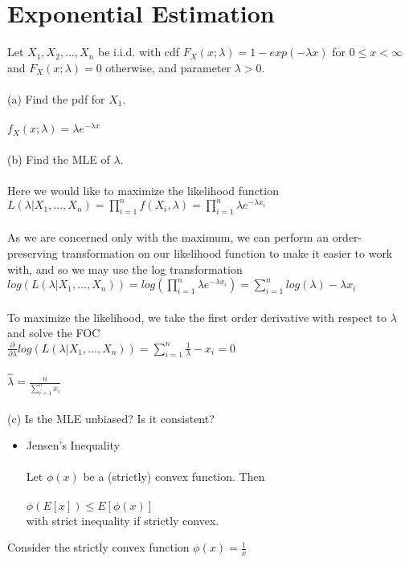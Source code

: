 \documentclass{article}
\begin{document}
\section{Exponential Estimation}
Let $X_1,X_2,...,X_n$ be i.i.d. with cdf $F_X(x;\lambda)=1-exp(-\lambda x)$ for $0\leq x<\infty$ and $F_X(x;\lambda)=0$ otherwise, and parameter $\lambda>0$.\\\\
(a) Find the pdf for $X_1$.\\\\
$f_X(x;\lambda)=\lambda e^{-\lambda x}$\\\\
(b) Find the MLE of $\lambda$.\\\\
Here we would like to maximize the likelihood function\\ $L(\lambda|X_1,...,X_n)=\prod_{i=1}^nf(X_i,\lambda)=\prod_{i=1}^n\lambda e^{-\lambda x_i}$\\\\
As we are concerned only with the maximum, we can perform an order-preserving transformation on our likelihood function to make it easier to work with, and so we may use the log transformation\\
$log(L(\lambda|X_1,...,X_n))=log(\prod_{i=1}^n\lambda e^{-\lambda x_i})=\sum_{i=1}^nlog(\lambda)-\lambda x_i$\\\\
To maximize the likelihood, we take the first order derivative with respect to $\lambda$ and solve the FOC\\
$\frac{\partial}{\partial \lambda}log(L(\lambda|X_1,...,X_n))=\sum_{i=1}^n\frac{1}{\lambda}-x_i=0$\\\\
$\hat{\lambda}=\frac{n}{\sum_{i=1}^nx_i}$\\\\
(c) Is the MLE unbiased?  Is it consistent?
\begin{itemize}
    \item Jensen's Inequality\\\\
    Let $\phi(x)$ be a (strictly) convex function. Then\\\\
    $\phi(E[x])\leq E[\phi(x)]$\\
    with strict inequality if strictly convex.
\end{itemize}
Consider the strictly convex function $\phi(x)=\frac{1}{x}$\\\\
\end{document}
